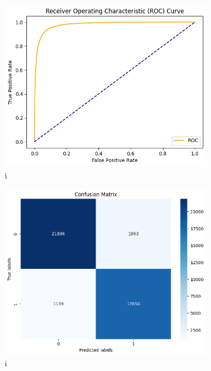 \documentclass{josis}
\begin{document}
\begin{figure}
\centering


\begin{subfigure}{.24\textwidth}
    \centering
    \includegraphics[width=0.95\linewidth]{ROC3.png}  
    \caption{i}
    \label{SUBFIGURE LABEL 1}
\end{subfigure}
\begin{subfigure}{.24\textwidth}
    \centering
    \includegraphics[width=0.95\linewidth]{CM3.png}  
    \caption{i}
    \label{SUBFIGURE LABEL 2}
\end{subfigure}
\begin{subfigure}{.24\textwidth}
    \centering

\end{subfigure}
\end{figure}
\end{document}
